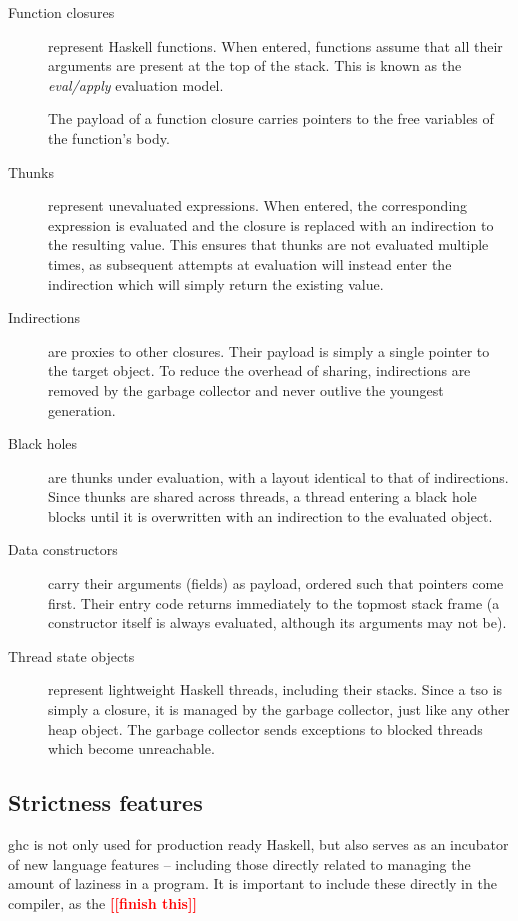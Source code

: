 \documentclass[thesis=B,english]{FITthesis}[2019/12/23]
\newcommand{\todo}[1]{\textcolor{red}{\textbf{[[#1]]}}}
\begin{document}
\begin{description}
	\item[Function closures] represent Haskell functions. When entered,
		functions assume that all their arguments are present at the top of the
		stack. This is known as the \textit{eval/apply} evaluation
		model\cite{eval-apply}.

		The payload of a function closure carries pointers to the free
		variables of the function's body.

	\item[Thunks] represent unevaluated expressions. When entered, the
		corresponding expression is evaluated and the closure is replaced with
		an indirection to the resulting value. This ensures that thunks are not
		evaluated multiple times, as subsequent attempts at evaluation will
		instead enter the indirection which will simply return the existing
		value.

	\item[Indirections] are proxies to other closures. Their payload is simply
		a single pointer to the target object. To reduce the overhead of
		sharing, indirections are removed by the garbage collector and never
		outlive the youngest generation.

	\item[Black holes] are thunks under evaluation, with a layout identical to
		that of indirections. Since thunks are shared across threads, a thread
		entering a black hole blocks until it is overwritten with an
		indirection to the evaluated object.

	\item[Data constructors] carry their arguments (fields) as payload, ordered
		such that pointers come first. Their entry code returns immediately to
		the topmost stack frame (a constructor itself is always evaluated,
		although its arguments may not be).

	\item[Thread state objects] represent lightweight Haskell threads,
		including their stacks. Since a \acrshort{tso} is simply a closure, it
		is managed by the garbage collector, just like any other heap object.
		The garbage collector sends exceptions to blocked threads which become
		unreachable.
\end{description}


\subsection{Strictness features}
\acrshort{ghc} is not only used for production ready Haskell, but also serves
as an incubator of new language features -- including those directly related to
managing the amount of laziness in a program. It is important to include these
directly in the compiler, as the \todo{finish this}
\end{document}
